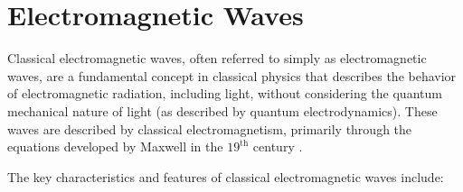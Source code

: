 \documentclass{article}
\theoremstyle{definition}
\begin{document}
\smallskip
\section{Electromagnetic Waves}
\label{sec:emwaves}
Classical electromagnetic waves, often referred to simply as
electromagnetic waves, are a fundamental concept in classical
physics that describes the behavior of electromagnetic radiation,
including light, without considering the quantum mechanical
nature of light (as described by quantum electrodynamics). These
waves are described by classical electromagnetism, primarily
through the equations developed by Maxwell in the $19^{\text{th}}$ 
century \cite{wikipedia:maxwells_equations}.

\bigskip
\noindent
The key characteristics and features of classical electromagnetic 
waves include: 
\end{document}
